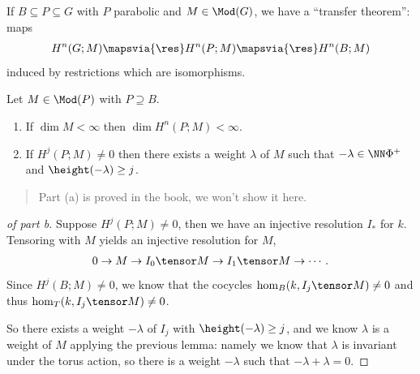 If \(B\subseteq P \subseteq G\) with \(P\) parabolic and
\(M\in \Mod(G)\), we have a ``transfer theorem'': maps
\begin{align*}  
H^n(G; M) \mapsvia{\res} H^n(P; M) \mapsvia{\res} H^n(B; M)
\end{align*} induced by restrictions which are isomorphisms.

\begin{proposition}[?]

Let \(M\in \Mod(P)\) with \(P\supseteq B\).

\begin{enumerate}
\def\labelenumi{\alph{enumi}.}
\item
  If \(\dim M < \infty\) then \(\dim H^n(P; M) < \infty\).
\item
  If \(H^j(P; M) \neq 0\) then there exists a weight \(\lambda\) of
  \(M\) such that \(-\lambda \in \NN \Phi^+\) and
  \(\height(-\lambda) \geq j\).
\end{enumerate}

\end{proposition}

\begin{quote}
Part (a) is proved in the book, we won't show it here.
\end{quote}

\begin{proof}[of part b]

Suppose \(H^j(P; M) \neq 0\), then we have an injective resolution
\(I_*\) for \(k\). Tensoring with \(M\) yields an injective resolution
for \(M\),
\begin{align*}  
0 \to M \to I_0\tensor M \to I_1 \tensor M \to \cdots
.\end{align*} Since \(H^j(B; M) \neq 0\), we know that the cocycles
\(\hom_B(k, I_j\tensor M) \neq 0\) and thus
\(\hom_T(k, I_j\tensor M) \neq 0\).

So there exists a weight \(-\lambda\) of \(I_j\) with
\(\height(-\lambda) \geq j\), and we know \(\lambda\) is a weight of
\(M\) applying the previous lemma: namely we know that \(\lambda\) is
invariant under the torus action, so there is a weight \(-\lambda\) such
that \(-\lambda + \lambda = 0\).

\end{proof}


